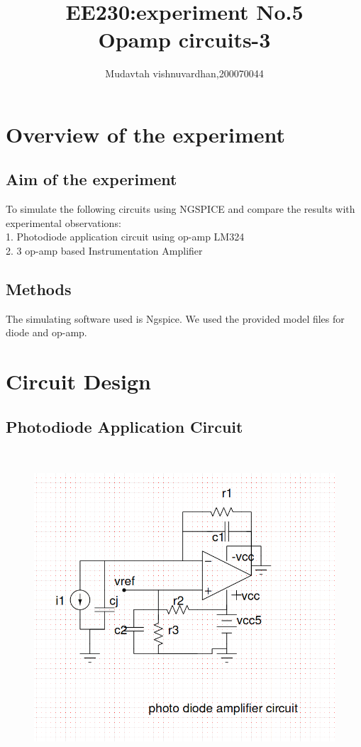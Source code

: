 \documentclass[12pt]{article}
\title{EE230:experiment No.5\\
Opamp circuits-3}
\author{Mudavtah vishnuvardhan,200070044}
\begin{document}
\maketitle


\section{Overview of the experiment} %

\subsection{Aim of the experiment}%
To simulate the following circuits using NGSPICE
and compare the results with experimental observations:\\
1. Photodiode application circuit using op-amp LM324\\
2. 3 op-amp based Instrumentation Amplifier\\


\subsection{Methods}

The simulating software used is Ngspice.
We used the provided model files for diode and op-amp. 

\section{Circuit Design}
\subsection{Photodiode Application Circuit}
\\
\begin{figure}[h!]
\centering
\includegraphics[scale=0.3]{photo_diode_amp.png}
\end{figure}
\newpage
\end{document}

